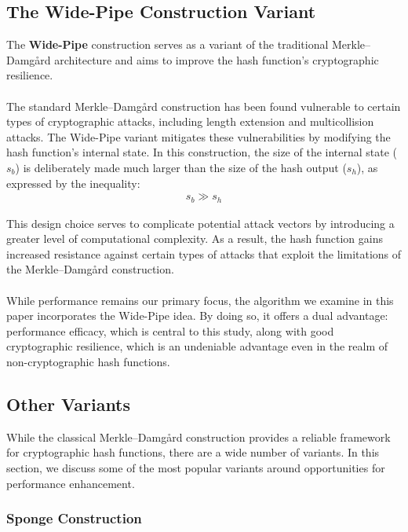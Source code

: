 \documentclass[10pt]{article}
\begin{document}
\subsection{The Wide-Pipe Construction Variant} \label{widepipe}

The \textbf{Wide-Pipe} construction serves as a variant of the traditional Merkle–Damgård architecture and aims to improve the hash function's cryptographic resilience.\\\\
The standard Merkle–Damgård construction has been found vulnerable to certain types of cryptographic attacks, including length extension and multicollision attacks. The Wide-Pipe variant mitigates these vulnerabilities by modifying the hash function's internal state.
In this construction, the size of the internal state (\(s_b\)) is deliberately made much larger than the size of the hash output
(\(s_h\)), as expressed by the inequality:
\begin{align*}
    s_b \gg s_h
\end{align*}

This design choice serves to complicate potential attack vectors by introducing a greater level of computational complexity.
As a result, the hash function gains increased resistance against certain types of attacks that exploit the limitations of the Merkle–Damgård construction.\\\\
While performance remains our primary focus, the algorithm we examine in this paper incorporates the Wide-Pipe idea. By doing so, it offers a dual advantage: performance efficacy, which is central to this study, along with good cryptographic resilience, which is an undeniable advantage even in the realm of non-cryptographic hash functions.

\subsection{Other Variants}

While the classical Merkle–Damgård construction provides a reliable framework for cryptographic hash functions, there are a wide number of variants\cite{merkle_damgard_alternatives_review}. In this section, we discuss some of the most popular variants around opportunities for performance enhancement.

\subsubsection{Sponge Construction}
\end{document}
